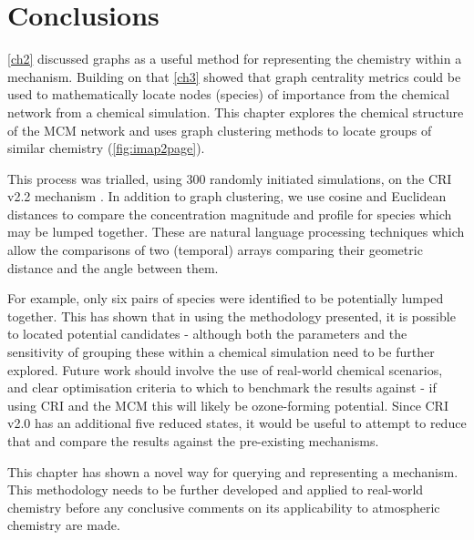 %
%
%
%
%
%
%
%
%
%
%
%
%
%
%
%
%
%
%
%
%
%
%
%
%
%
%
%
%





\newpage

\section{Conclusions}

\autoref{ch2} discussed graphs as a useful method for representing the chemistry within a mechanism. Building on that \autoref{ch3} showed that graph centrality metrics could be used to mathematically locate nodes (species) of importance from the chemical network from a chemical simulation. This chapter explores the chemical structure of the MCM network and uses graph clustering methods to locate groups of similar chemistry (\autoref{fig:imap2page}).

This process was trialled, using 300 randomly initiated simulations, on the CRI v2.2 mechanism \citep{cri}. In addition to graph clustering, we use cosine and Euclidean distances to compare the concentration magnitude and profile for species which may be lumped together. These are natural language processing techniques which allow the comparisons of two (temporal) arrays comparing their geometric distance and the angle between them.

For example, only six pairs of species were identified to be potentially lumped together. This has shown that in using the methodology presented, it is possible to located potential candidates -  although both the parameters and the sensitivity of grouping these within a chemical simulation need to be further explored. Future work should involve the use of real-world chemical scenarios, and clear optimisation criteria to which to benchmark the results against - if using CRI and the MCM this will likely be ozone-forming potential. Since CRI v2.0 has an additional five reduced states, it would be useful to attempt to reduce that and compare the results against the pre-existing mechanisms.

This chapter has shown a novel way for querying and representing a mechanism. This methodology needs to be further developed and applied to real-world chemistry before any conclusive comments on its applicability to atmospheric chemistry are made.
